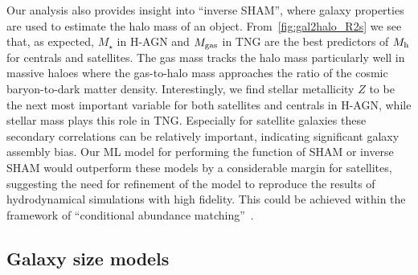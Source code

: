 \documentclass[usenatbib,useAMS]{mnras}
\begin{document}
Our analysis also provides insight into ``inverse SHAM'', where galaxy properties are used to estimate the halo mass of an object. From~\cref{fig:gal2halo_R2s} we see that, as expected, $M_\star$ in H-AGN and $M_{\rm gas}$ in TNG are the best predictors of $M_{\rm h}$ for centrals and satellites. The gas mass tracks the halo mass particularly well in massive haloes where the gas-to-halo mass approaches the ratio of the cosmic baryon-to-dark matter density. Interestingly, we find stellar metallicity $Z$ to be the next most important variable for both satellites and centrals in H-AGN, while stellar mass plays this role in TNG. Especially for satellite galaxies these secondary correlations can be relatively important, indicating significant galaxy assembly bias. Our ML model for performing the function of SHAM or inverse SHAM would outperform these models by a considerable margin for satellites, suggesting the need for refinement of the model to reproduce the results of hydrodynamical simulations with high fidelity. This could be achieved within the framework of ``conditional abundance matching''~\citep{CAM}.

\subsection{Galaxy size models}\label{sec:galaxy_size_models}
\end{document}
